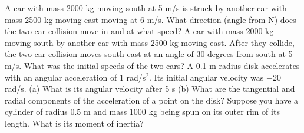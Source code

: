 \documentclass[12pt]{article}
\begin{document}
\noindent A car with mass 2000 kg moving south at 5 m/s is struck by another car with mass 2500 kg moving east moving at 6 m/s.  What direction (angle from N) does the two car collision move in and at what speed? 
\newpage
\noindent A car with mass 2000 kg moving south by another car with mass 2500 kg moving east.  After they collide, the two car collision moves south east at an angle of 30 degrees from south at 5 m/s.  What was the initial speeds of the two cars?
\newpage
\noindent A 0.1 m radius disk accelerates with an angular acceleration of $1$ rad/s$^2$.  Its initial angular velocity was $-20$ rad/s. (a) What is its angular velocity after 5 s (b) What are the tangential and radial components of the acceleration of a point on the disk? 
\newpage
\noindent Suppose you have a cylinder of radius 0.5 m and mass 1000 kg being spun on its outer rim of its length.  What is its moment of inertia? 
\end{document}
